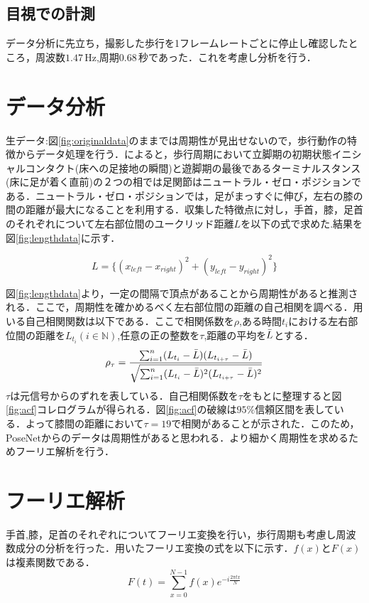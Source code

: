 \documentclass[a4j,10.5pt]{jreport}
\begin{document}
\newpage
\subsection{目視での計測}
データ分析に先立ち，撮影した歩行を1フレームレートごとに停止し確認したところ，周波数$1.47\,\mathrm{Hz}$,周期$0.68\,\mathrm{秒}$であった．これを考慮し分析を行う．
\section{データ分析}
生データ:図\ref{fig:originaldata}のままでは周期性が見出せないので，歩行動作の特徴からデータ処理を行う．\cite{gait_analyse}によると，歩行周期において立脚期の初期状態イニシャルコンタクト(床への足接地の瞬間)と遊脚期の最後であるターミナルスタンス(床に足が着く直前)の２つの相では足関節はニュートラル・ゼロ・ポジションである．ニュートラル・ゼロ・ポジションでは，足がまっすぐに伸び，左右の膝の間の距離が最大になることを利用する．収集した特徴点に対し，手首，膝，足首のそれぞれについて左右部位間のユークリッド距離$L$を以下の式で求めた.結果を図\ref{fig:lengthdata}に示す．

\begin{equation}
  L = \{(x_{left} - x_{right})^2 + (y_{left} - y_{right})^2\}
\end{equation}

図\ref{fig:lengthdata}より，一定の間隔で頂点があることから周期性があると推測される．ここで，周期性を確かめるべく左右部位間の距離の自己相関を調べる．用いる自己相関関数は以下である．ここで相関係数を$\rho$,ある時間$t_i$における左右部位間の距離を$L_{t_i}(i\in \mathbb{N})$,任意の正の整数を$\tau$,距離の平均を$\Bar{L}$とする．
\begin{equation}
    \rho_\tau = \frac{\sum_{i=1}^{n}(L_{t_i}-\Bar{L})(L_{t_{i+\tau}}-\Bar{L})}
    {\sqrt{\sum_{i=1}^{n}(L_{t_{i}}-\Bar{L})^2(L_{t_{i+\tau}}-\Bar{L})^2}}
\end{equation}
$\tau$は元信号からのずれを表している．自己相関係数を$\tau$をもとに整理すると図\ref{fig:acf}コレログラムが得られる．図\ref{fig:acf}の破線は$95\%$信頼区間を表している．よって膝間の距離において$\tau=19$で相関があることが示された．このため，PoseNetからのデータは周期性があると思われる．より細かく周期性を求めるためフーリエ解析を行う．
\newpage
\section{フーリエ解析}
手首,膝，足首のそれぞれについてフーリエ変換を行い，歩行周期も考慮し周波数成分の分析を行った．用いたフーリエ変換の式を以下に示す．$f(x)$と$F(x)$は複素関数である．
\begin{equation}
    F(t)=\sum_{x=0}^{N-1}f(x)e^{-i\frac{2\pi tx}{N}}
\end{equation}
\end{document}
